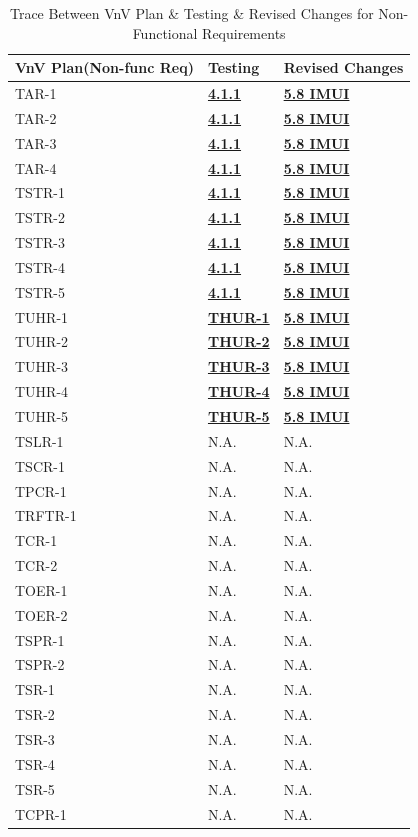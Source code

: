 \documentclass[12pt, titlepage]{article}
\begin{document}
\begin{table}[H]
\centering
\caption{caption}
\begin{tabular}{p{} p{} p{}}
\toprule
\textbf{VnV Plan(Non-func Req)} & \textbf{Testing} & \textbf{Revised Changes}\\
\midrule
TAR-1 & \hyperref[4.1.1]{\textbf{4.1.1}} & \hyperref[IMUI]{\textbf{5.8 IMUI}}\\
TAR-2 & \hyperref[4.1.1]{\textbf{4.1.1}} & \hyperref[IMUI]{\textbf{5.8 IMUI}}\\
TAR-3 & \hyperref[4.1.1]{\textbf{4.1.1}} & \hyperref[IMUI]{\textbf{5.8 IMUI}}\\
TAR-4 & \hyperref[4.1.1]{\textbf{4.1.1}} & \hyperref[IMUI]{\textbf{5.8 IMUI}}\\
TSTR-1 & \hyperref[4.1.1]{\textbf{4.1.1}} & \hyperref[IMUI]{\textbf{5.8 IMUI}}\\
TSTR-2 & \hyperref[4.1.1]{\textbf{4.1.1}} & \hyperref[IMUI]{\textbf{5.8 IMUI}}\\
TSTR-3 & \hyperref[4.1.1]{\textbf{4.1.1}} & \hyperref[IMUI]{\textbf{5.8 IMUI}}\\
TSTR-4 & \hyperref[4.1.1]{\textbf{4.1.1}} & \hyperref[IMUI]{\textbf{5.8 IMUI}}\\
TSTR-5 & \hyperref[4.1.1]{\textbf{4.1.1}} & \hyperref[IMUI]{\textbf{5.8 IMUI}}\\
TUHR-1 & \hyperref[4.1.2]{\textbf{THUR-1}} & \hyperref[IMUI]{\textbf{5.8 IMUI}}\\
TUHR-2 & \hyperref[4.1.2]{\textbf{THUR-2}} & \hyperref[IMUI]{\textbf{5.8 IMUI}}\\
TUHR-3 & \hyperref[4.1.2]{\textbf{THUR-3}} & \hyperref[IMUI]{\textbf{5.8 IMUI}}\\
TUHR-4 & \hyperref[4.1.2]{\textbf{THUR-4}} & \hyperref[IMUI]{\textbf{5.8 IMUI}}\\
TUHR-5 & \hyperref[4.1.2]{\textbf{THUR-5}} & \hyperref[IMUI]{\textbf{5.8 IMUI}}\\
TSLR-1 & N.A. & N.A.\\
TSCR-1 & N.A. & N.A.\\
TPCR-1 & N.A. & N.A.\\
TRFTR-1 &N.A.  & N.A.\\
TCR-1 &N.A.  & N.A.\\
TCR-2 & N.A. & N.A.\\
TOER-1 & N.A. & N.A.\\
TOER-2 & N.A. & N.A.\\
TSPR-1 & N.A. & N.A.\\
TSPR-2 &N.A.  & N.A.\\
TSR-1 & N.A. & N.A.\\
TSR-2 & N.A. & N.A.\\
TSR-3 & N.A. & N.A.\\
TSR-4 & N.A. & N.A.\\
TSR-5 & N.A. & N.A.\\
TCPR-1 & N.A. & N.A.\\
\bottomrule
\end{tabular}
\caption{Trace Between VnV Plan \& Testing \& Revised Changes for Non-Functional Requirements}
\label{TblRT}
\end{table}
\end{document}
